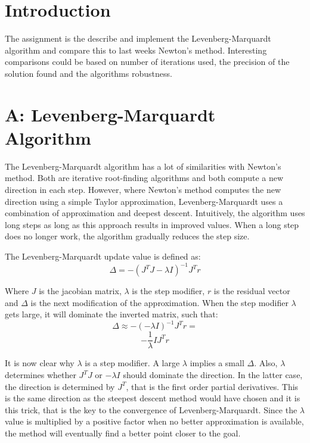 \documentclass[10pt,oneside,a4paper,final,english]{memoir}
\begin{document}




\maketitle
\newpage


\section{Introduction}
The assignment is the describe and implement the Levenberg-Marquardt
algorithm and compare this to last weeks Newton's method. Interesting
comparisons could be based on number of iterations used, the precision
of the solution found and the algorithms robustness.



\section*{A: Levenberg-Marquardt Algorithm}

The Levenberg-Marquardt algorithm has a lot of similarities with
Newton's method. Both are iterative root-finding algorithms and both
compute a new direction in each step. However, where Newton's method
computes the new direction using a simple Taylor approximation,
Levenberg-Marquardt uses a combination of approximation and deepest
descent. Intuitively, the algorithm uses long steps as long as this
approach results in improved values. When a long step does no longer
work, the algorithm gradually reduces the step size.

The Levenberg-Marquardt update value is defined as:
\[ \Delta = - (J^TJ - \lambda I)^{-1} J^T r\]

Where $J$ is the jacobian matrix, $\lambda$ is the step modifier,
$r$ is the residual vector and $\Delta$ is the next modification of
the approximation.
When the step modifier $\lambda$ gets large, it will dominate the
inverted matrix, such that:
\[ \Delta \approx - (-\lambda I)^{-1} J^T r = \]
\[ - \frac{1}{\lambda}I J^T r \]

It is now clear why $\lambda$ is a step modifier. A large $\lambda$
implies a small $\Delta$. Also, $\lambda$ determines whether $J^TJ$ or
$-\lambda I$ should dominate the direction. In the latter case, the
direction is determined by $J^T$, that is the first order partial
derivatives. This is the same direction as the steepest descent method
would have chosen and it is this trick, that is the key to the
convergence of Levenberg-Marquardt. Since the $\lambda$ value is
multiplied by a positive factor when no better approximation is
available, the method will eventually find a better point closer to
the goal.
\end{document}

